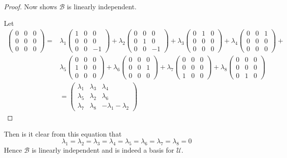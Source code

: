 \documentclass{article}
\begin{document}
\begin{proof}
Now shows $\mathcal{B}$ is linearly independent.

Let 
\begin{align*}
\begin{pmatrix}0&0&0\\0&0&0\\0&0&0 \end{pmatrix}  = &\lambda_1 \begin{pmatrix} 1&0&0\\0&0&0\\0&0&-1 \end{pmatrix}+\lambda_2 \begin{pmatrix} 0&0&0\\0&1&0\\0&0&-1 \end{pmatrix}+\lambda_3 \begin{pmatrix} 0&1&0\\0&0&0\\0&0&0 \end{pmatrix}+\lambda_4\begin{pmatrix} 0&0&1\\0&0&0\\0&0&0 \end{pmatrix}+ \\
&\lambda_5 \begin{pmatrix} 0&0&0\\1&0&0\\0&0&0 \end{pmatrix}+\lambda_6\begin{pmatrix} 0&0&0\\0&0&1\\0&0&0 \end{pmatrix}+\lambda_7 \begin{pmatrix} 0&0&0\\0&0&0\\1&0&0 \end{pmatrix}+\lambda_8 \begin{pmatrix} 0&0&0\\0&0&0\\0&1&0 \end{pmatrix} \\
&= \begin{pmatrix} \lambda_1&\lambda_3&\lambda_4 \\ \lambda_5&\lambda_2&\lambda_6 \\ \lambda_7&\lambda_8&-\lambda_1 -\lambda_2 \end{pmatrix}
\end{align*}
\end{proof}
Then is it clear from this equation that $$\lambda_1 = \lambda_2=\lambda_3 =\lambda_4=\lambda_5=\lambda_6=\lambda_7=\lambda_8 =0$$Hence $\mathcal{B}$ is linearly independent and is indeed a basis for $\mathcal{U}$.
\end{document}
